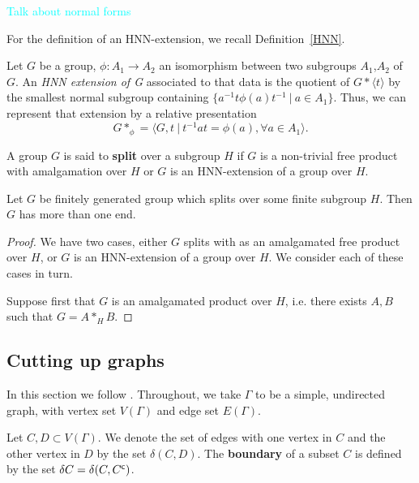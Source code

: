  \textcolor{cyan}{Talk about normal forms}

For the definition of an HNN-extension, we recall Definition~\ref{HNN}.

 \begin{definition}
     Let $G$ be a group, $\phi: A_1 \to A_2$ an isomorphism between two subgroups $A_1$,$A_2$ of $G$. An \emph{HNN extension of G} associated to that data is the quotient of $G \ast \langle t \rangle$ by the smallest normal subgroup containing $\{a^{-1}t\phi(a)t^{-1} \: | \: a \in A_1 \}$. Thus, we can represent that extension by a relative presentation 
    \[G \ast_\phi = \langle G,t \: | \: t^{-1}at = \phi(a), \forall a \in A_1 \rangle. \]
 \end{definition}

\begin{definition}[Splitting]
    A group \(G\) is said to \textbf{split} over a subgroup \(H\) if \(G\) is a non-trivial free product with amalgamation over \(H\) or \(G\) is an HNN-extension of a group over \(H\). 
\end{definition}

\begin{theorem}
    Let \(G\) be finitely generated group which splits over some finite subgroup \(H\). Then \(G\) has more than one end.
\end{theorem}

\begin{proof}
    We have two cases, either \(G\) splits with as an amalgamated free product over \(H\), or \(G\) is an HNN-extension of a group over \(H\). We consider each of these cases in turn.

    Suppose first that \(G\) is an amalgamated product over \(H\), i.e. there exists \(A,B\) such that \(G = A *_H B\).

\end{proof}

\subsection{Cutting up graphs}

In this section we follow \cite{K10}. Throughout, we take \(\Gamma\) to be a simple, undirected graph, with vertex set \(V(\Gamma)\) and edge set \(E(\Gamma)\).

\begin{definition}
    Let \(C,D \subset V(\Gamma)\). We denote the set of edges with one vertex in \(C\) and the other vertex in \(D\) by the set \(\delta(C,D)\). The \textbf{boundary} of a subset \(C\) is defined by the set \(\delta C = \delta(C, {C}^{\mathsf{c}})\).
\end{definition}

